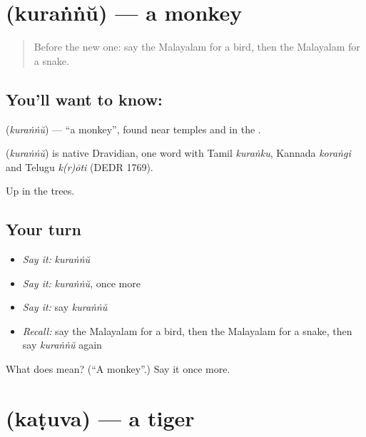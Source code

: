 \section[\texorpdfstring{\ml{കുരങ്ങ്} (kuraṅṅŭ)}{കുരങ്ങ് (kuraṅṅŭ)}]{ (kuraṅṅŭ) — a monkey}

\label{lesson:ML-C138-monkey}



\begin{quote}
Before the new one: say the Malayalam for a bird, then the Malayalam for a snake.
\end{quote}

\subsection*{You'll want to know: }
\textbf{} (\emph{kuraṅṅŭ}) — \textquotedblleft{}a monkey\textquotedblright{}, found near temples and in the \textbf{}.

\begin{cousinweb}
\textbf{} (\emph{kuraṅṅŭ}) is native Dravidian, one word with Tamil \emph{kuraṅku}, Kannada \emph{koraṅgi} and Telugu \emph{k(r)ōti} (DEDR 1769).
\end{cousinweb}

\begin{grammarlens}[title={What you've built}]
Up in the trees.
\end{grammarlens}

\subsection*{Your turn}
\begin{itemize}
\raggedright
  \item \emph{Say it:} \emph{kuraṅṅŭ}
  \item \emph{Say it:} \emph{kuraṅṅŭ}, once more
  \item \emph{Say it:} say \emph{kuraṅṅŭ}
  \item \emph{Recall:} say the Malayalam for a bird, then the Malayalam for a snake, then say \emph{kuraṅṅŭ} again
\end{itemize}

\begin{tcolorbox}[breakable,colback=teal!4,colframe=teal!35!black,title={Before you move on}]
What does  mean? (\textquotedblleft{}A monkey\textquotedblright{}.) Say it once more.
\end{tcolorbox}
\section[\texorpdfstring{\ml{കടുവ} (kaṭuva)}{കടുവ (kaṭuva)}]{ (kaṭuva) — a tiger}

